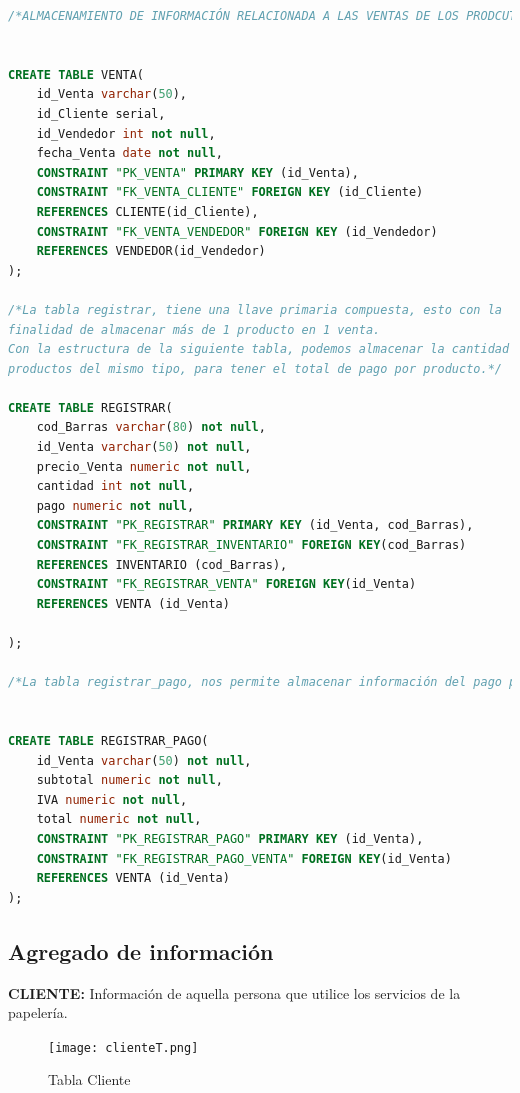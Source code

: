 \documentclass[30pt,fleqn]{article}
\begin{document}
\begin{lstlisting}[language=sql, caption={DDL.Estructura de base de datos Papelería. }]
/*ALMACENAMIENTO DE INFORMACIÓN RELACIONADA A LAS VENTAS DE LOS PRODCUTOS*/


CREATE TABLE VENTA(
	id_Venta varchar(50),
	id_Cliente serial,
	id_Vendedor int not null,
	fecha_Venta date not null,
	CONSTRAINT "PK_VENTA" PRIMARY KEY (id_Venta),
	CONSTRAINT "FK_VENTA_CLIENTE" FOREIGN KEY (id_Cliente)
	REFERENCES CLIENTE(id_Cliente),
	CONSTRAINT "FK_VENTA_VENDEDOR" FOREIGN KEY (id_Vendedor)
	REFERENCES VENDEDOR(id_Vendedor)
);

/*La tabla registrar, tiene una llave primaria compuesta, esto con la 
finalidad de almacenar más de 1 producto en 1 venta. 
Con la estructura de la siguiente tabla, podemos almacenar la cantidad de 
productos del mismo tipo, para tener el total de pago por producto.*/

CREATE TABLE REGISTRAR(
	cod_Barras varchar(80) not null,
	id_Venta varchar(50) not null,
	precio_Venta numeric not null,
	cantidad int not null,
	pago numeric not null,
	CONSTRAINT "PK_REGISTRAR" PRIMARY KEY (id_Venta, cod_Barras),
	CONSTRAINT "FK_REGISTRAR_INVENTARIO" FOREIGN KEY(cod_Barras)
	REFERENCES INVENTARIO (cod_Barras),
	CONSTRAINT "FK_REGISTRAR_VENTA" FOREIGN KEY(id_Venta)
	REFERENCES VENTA (id_Venta)
 
);

/*La tabla registrar_pago, nos permite almacenar información del pago por venta realizada.*/


CREATE TABLE REGISTRAR_PAGO(
	id_Venta varchar(50) not null,
	subtotal numeric not null,
	IVA numeric not null,
	total numeric not null,
	CONSTRAINT "PK_REGISTRAR_PAGO" PRIMARY KEY (id_Venta),
	CONSTRAINT "FK_REGISTRAR_PAGO_VENTA" FOREIGN KEY(id_Venta)
	REFERENCES VENTA (id_Venta)
);

\end{lstlisting}

\newpage
\subsection{Agregado de información}

\vspace{5mm} %

\textbf{CLIENTE:} Información de aquella persona que utilice los servicios de la papelería.

\begin{figure}[h]
    \centering
    \texttt{[image: clienteT.png]}
    \caption{Tabla Cliente}
    \label{fig:Tabla Cliente}
\end{figure}
\end{document}
